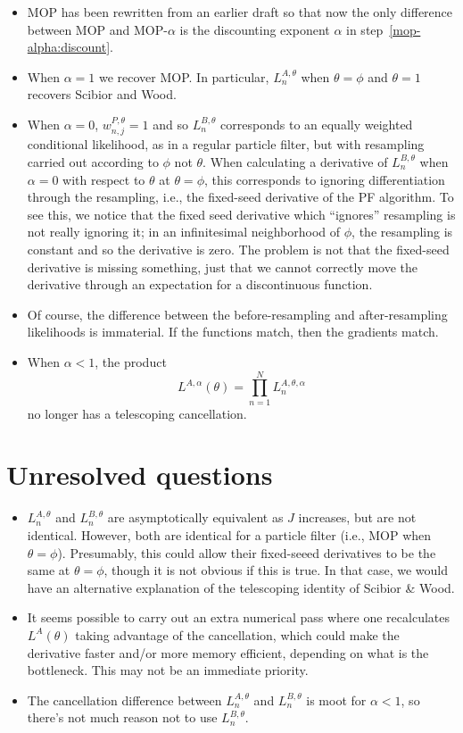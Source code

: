\documentclass[12p]{article}
\begin{document}
\begin{itemize}
\item MOP has been rewritten from an earlier draft so that now the only difference between MOP and MOP-$\alpha$ is the discounting exponent $\alpha$ in step~\ref{mop-alpha:discount}.
\item When $\alpha=1$ we recover MOP. In particular, $L^{A,\theta}_n$ when $\theta=\phi$ and $\theta=1$ recovers Scibior and Wood. 
\item When $\alpha=0$, $w^{P,\theta}_{n,j}=1$ and so $L^{B,\theta}_n$ corresponds to an equally weighted conditional likelihood, as in a regular particle filter, but with resampling carried out according to $\phi$ not $\theta$.
  When calculating a derivative of $L_n^{B, \theta}$ when $\alpha=0$ with respect to $\theta$ at $\theta=\phi$, this corresponds to ignoring differentiation through the resampling, i.e., the fixed-seed derivative of the PF algorithm.
  To see this, we notice that the fixed seed derivative which ``ignores'' resampling is not really ignoring it; in an infinitesimal neighborhood of $\phi$, the resampling is constant and so the derivative is zero.
  The problem is not that the fixed-seed derivative is missing something, just that we cannot correctly move the derivative through an expectation for a discontinuous function.
\item Of course, the difference between the before-resampling and after-resampling likelihoods is immaterial. If the functions match, then the gradients match. 
\item When $\alpha < 1$, the product
\[
  L^{A,\alpha}(\theta)=\prod_{n=1}^N L^{A,\theta,\alpha}_n
\]
no longer has a telescoping cancellation. 
\end{itemize}

\section{Unresolved questions}

\begin{itemize}
\item $L^{A,\theta}_n$ and $L^{B,\theta}_n$ are asymptotically equivalent as $J$ increases, but are not identical.
  However, both are identical for a particle filter (i.e., MOP when $\theta=\phi$).
  Presumably, this could allow their fixed-seeed derivatives to be the same at $\theta=\phi$, though it is not obvious if this is true.
  In that case, we would have an alternative explanation of the telescoping identity of Scibior \& Wood.
 
\item It seems possible to carry out an extra numerical pass where one recalculates $L^A(\theta)$ taking advantage of the cancellation, which could make the derivative faster and/or more memory efficient, depending on what is the bottleneck. This may not be an immediate priority.

  \item The cancellation difference between  $L^{A,\theta}_n$ and $L^{B,\theta}_n$ is moot for $\alpha<1$, so there's not much reason not to use $L^{B,\theta}_n$.
 
\end{itemize}
\end{document}
